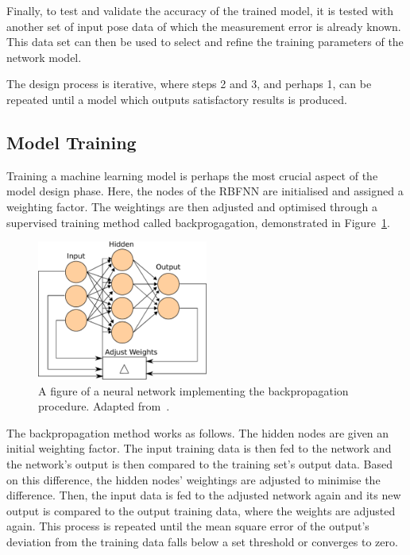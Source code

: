 Finally, to test and validate the accuracy of the trained model, it is tested with another set of input pose data of which the measurement error is already known. This data set can then be used to select and refine the training parameters of the network model. 

The design process is iterative, where steps 2 and 3, and perhaps 1, can be repeated until a model which outputs satisfactory results is produced. 

\subsection{Model Training}

Training a machine learning model is perhaps the most crucial aspect of the model design phase. Here, the nodes of the RBFNN are initialised and assigned a weighting factor. The weightings are then adjusted and optimised through a supervised training method called backprogagation, demonstrated in Figure~\ref{fig:chap4-backprogagation}.

\begin{figure}
  \centering
  \includegraphics[width=0.5\textwidth]{figures/chapter4/backpropagation}
  \caption[A neural network implementing the backpropagation procedure.]{A figure of a neural network implementing the backpropagation procedure. Adapted from~\cite{ann-wiki-pic}.}
\label{fig:chap4-backprogagation}
\end{figure}

The backpropagation method works as follows. The hidden nodes are given an initial weighting factor. The input training data is then fed to the network and the network's output is then compared to the training set's output data. Based on this difference, the hidden nodes' weightings are adjusted to minimise the difference. Then, the input data is fed to the adjusted network again and its new output is compared to the output training data, where the weights are adjusted again. This process is repeated until the mean square error of the output's deviation from the training data falls below a set threshold or converges to zero. 

